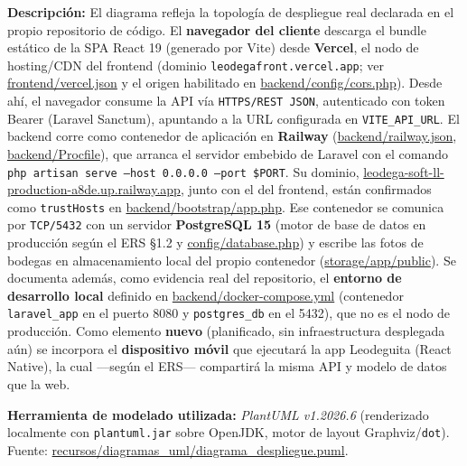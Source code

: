 \noindent\textbf{Descripción:} El diagrama refleja la topología de despliegue real declarada en el propio repositorio de código. El \textbf{navegador del cliente} descarga el bundle estático de la SPA React 19 (generado por Vite) desde \textbf{Vercel}, el nodo de hosting/CDN del frontend (dominio \texttt{leodegafront.vercel.app}; ver \url{frontend/vercel.json} y el origen habilitado en \url{backend/config/cors.php}). Desde ahí, el navegador consume la API vía \texttt{HTTPS/REST JSON}, autenticado con token Bearer (Laravel Sanctum), apuntando a la URL configurada en \texttt{VITE\_API\_URL}. El backend corre como contenedor de aplicación en \textbf{Railway} (\url{backend/railway.json}, \url{backend/Procfile}), que arranca el servidor embebido de Laravel con el comando \texttt{php artisan serve --host 0.0.0.0 --port \$PORT}. Su dominio, \url{leodega-soft-ll-production-a8de.up.railway.app}, junto con el del frontend, están confirmados como \texttt{trustHosts} en \url{backend/bootstrap/app.php}. Ese contenedor se comunica por \texttt{TCP/5432} con un servidor \textbf{PostgreSQL 15} (motor de base de datos en producción según el ERS \S1.2 y \url{config/database.php}) y escribe las fotos de bodegas en almacenamiento local del propio contenedor (\url{storage/app/public}). Se documenta además, como evidencia real del repositorio, el \textbf{entorno de desarrollo local} definido en \url{backend/docker-compose.yml} (contenedor \texttt{laravel\_app} en el puerto 8080 y \texttt{postgres\_db} en el 5432), que no es el nodo de producción. Como elemento \textbf{nuevo} (planificado, sin infraestructura desplegada aún) se incorpora el \textbf{dispositivo móvil} que ejecutará la app Leodeguita (React Native), la cual —según el ERS— compartirá la misma API y modelo de datos que la web.

\bigskip
{\sloppy\noindent\textbf{Herramienta de modelado utilizada:} \textit{PlantUML v1.2026.6} (renderizado localmente con \texttt{plantuml.jar} sobre OpenJDK, motor de layout Graphviz/\texttt{dot}). Fuente: \url{recursos/diagramas_uml/diagrama_despliegue.puml}.\par}

